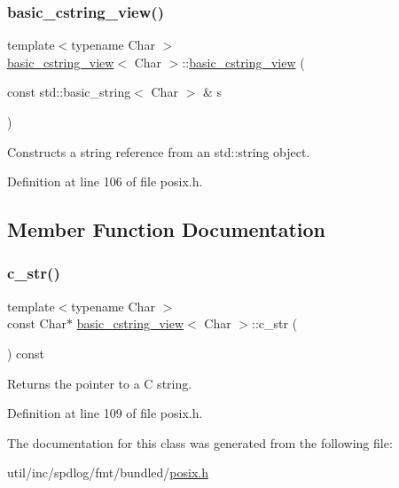 \subsubsection{\texorpdfstring{basic\+\_\+cstring\+\_\+view()}{basic\_cstring\_view()}\hspace{0.1cm}{\footnotesize\ttfamily [2/2]}}
{\footnotesize\ttfamily template$<$typename Char $>$ \\
\hyperlink{classbasic__cstring__view}{basic\+\_\+cstring\+\_\+view}$<$ Char $>$\+::\hyperlink{classbasic__cstring__view}{basic\+\_\+cstring\+\_\+view} (\begin{DoxyParamCaption}\item[{const std\+::basic\+\_\+string$<$ Char $>$ \&}]{s }\end{DoxyParamCaption})\hspace{0.3cm}{\ttfamily [inline]}}

Constructs a string reference from an {\ttfamily std\+::string} object.  

Definition at line 106 of file posix.\+h.



\subsection{Member Function Documentation}
\mbox{\label{classbasic__cstring__view_a19ace9be4e7617e5a978df29113279ee}} 
\subsubsection{\texorpdfstring{c\+\_\+str()}{c\_str()}}
{\footnotesize\ttfamily template$<$typename Char $>$ \\
const Char$\ast$ \hyperlink{classbasic__cstring__view}{basic\+\_\+cstring\+\_\+view}$<$ Char $>$\+::c\+\_\+str (\begin{DoxyParamCaption}{ }\end{DoxyParamCaption}) const\hspace{0.3cm}{\ttfamily [inline]}}

Returns the pointer to a C string. 

Definition at line 109 of file posix.\+h.



The documentation for this class was generated from the following file\+:\begin{DoxyCompactItemize}
\item 
util/inc/spdlog/fmt/bundled/\hyperlink{posix_8h}{posix.\+h}\end{DoxyCompactItemize}
